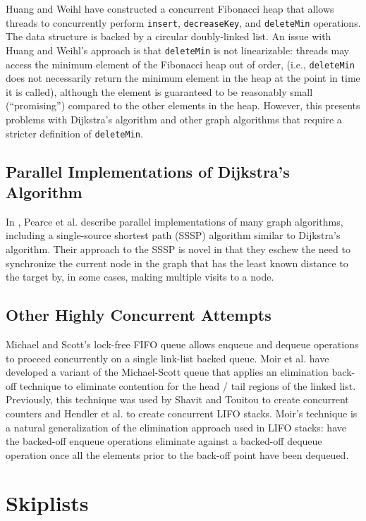 \documentclass{acm_proc_article-sp}
\begin{document}
Huang and Weihl \cite{huang91} have constructed a concurrent Fibonacci heap
that allows threads to concurrently perform \texttt{insert}, \texttt{decreaseKey}, and
\texttt{deleteMin} operations. The data structure is backed by a circular doubly-linked
list. An issue with Huang and Weihl's approach is that \texttt{deleteMin} is not
linearizable: threads may access the minimum element of the Fibonacci heap out of
order, (i.e., \texttt{deleteMin} does not necessarily return the minimum element in the heap at
the point in time it is called), although the element is guaranteed to be reasonably small (``promising'') compared to the other
elements in the heap. However, this presents problems with Dijkstra's algorithm and other
graph algorithms that require a stricter definition of \texttt{deleteMin}.

\subsection{Parallel Implementations of Dijkstra's Algorithm}
In \cite{pearce10}, Pearce et al. describe parallel
implementations of many graph algorithms, including
 a single-source shortest path (SSSP)
algorithm similar to Dijkstra's algorithm. Their
approach to the SSSP is novel in that they eschew the need
to synchronize the current node in the graph
that has the least known distance to the target
by, in some cases, making multiple visits to a node.


\subsection{Other Highly Concurrent Attempts}
Michael and Scott's \cite{michael96} lock-free FIFO queue allows enqueue
and dequeue operations to proceed concurrently on a
single link-list backed queue. Moir et al. have developed
\cite{moir05} a variant of the Michael-Scott queue that applies
an elimination back-off technique to eliminate contention for the
head / tail regions of the linked list. Previously, this
technique was used by Shavit and Touitou \cite{shavit97} to create
concurrent counters and Hendler et al.  \cite{hendler04} to create concurrent LIFO
stacks. Moir's technique is a natural generalization of the elimination
approach used in LIFO stacks: have the backed-off enqueue operations
eliminate against a backed-off dequeue operation once all the elements prior
to the back-off point have been dequeued.

\section{Skiplists}
\label{sec:skiplists}
\end{document}

